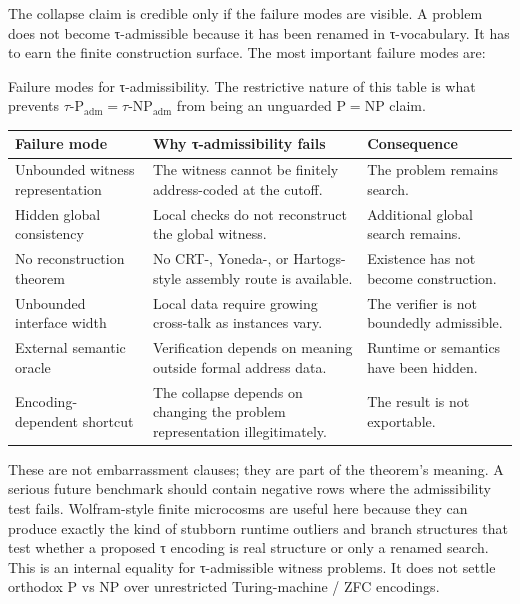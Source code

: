\documentclass{pantarhei-researchnote}
\newcommand{\Padm}{\ensuremath{\tau\text{-}\mathrm{P}_{\mathrm{adm}}}}
\newcommand{\NPadm}{\ensuremath{\tau\text{-}\mathrm{NP}_{\mathrm{adm}}}}
\newcommand{\ClassP}{\ensuremath{\mathrm{P}}}
\newcommand{\ClassNP}{\ensuremath{\mathrm{NP}}}
\begin{document}
The collapse claim is credible only if the failure modes are visible. A
problem does not become τ-admissible because it has been renamed in
τ-vocabulary. It has to earn the finite construction surface. The most
important failure modes are:

\begin{widetable}[t]
\caption{Failure modes for τ-admissibility. The restrictive nature of
this table is what prevents \(\Padm=\NPadm\) from being an unguarded
\(\ClassP=\ClassNP\) claim.}
\label{tab:admissibility-failures}
\prtablefont
\begin{tabularx}{\textwidth}{p{}Y Y}
\toprule
\textbf{Failure mode} & \textbf{Why τ-admissibility fails} & \textbf{Consequence} \\
\midrule
Unbounded witness representation & The witness cannot be finitely
address-coded at the cutoff. & The problem remains search. \\
Hidden global consistency & Local checks do not reconstruct the global
witness. & Additional global search remains. \\
No reconstruction theorem & No CRT-, Yoneda-, or Hartogs-style assembly
route is available. & Existence has not become construction. \\
Unbounded interface width & Local data require growing cross-talk as
instances vary. & The verifier is not boundedly admissible. \\
External semantic oracle & Verification depends on meaning outside formal
address data. & Runtime or semantics have been hidden. \\
Encoding-dependent shortcut & The collapse depends on changing the
problem representation illegitimately. & The result is not exportable. \\
\bottomrule
\end{tabularx}
\end{widetable}

These are not embarrassment clauses; they are part of the theorem's
meaning. A serious future benchmark should contain negative rows where
the admissibility test fails. Wolfram-style finite microcosms are useful
here because they can produce exactly the kind of stubborn runtime
outliers and branch structures that test whether a proposed τ encoding is
real structure or only a renamed search.
This is an internal equality for τ-admissible witness problems. It does
not settle orthodox P vs NP over unrestricted Turing-machine / ZFC
encodings.

\end{document}
